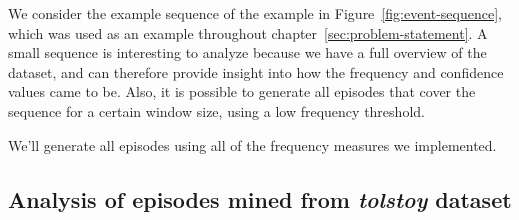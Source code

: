 We consider the example sequence of the example in Figure~\ref{fig:event-sequence}, which was used as an example throughout chapter~\ref{sec:problem-statement}. A small sequence is interesting to analyze because we have a full overview of the dataset, and can therefore provide insight into how the frequency and confidence values came to be. Also, it is possible to generate all episodes that cover the sequence for a certain window size, using a low frequency threshold.

We'll generate all episodes using all of the frequency measures we implemented.
\fi


\subsection{Analysis of episodes mined from \emph{tolstoy} dataset}
\label{sec:experiments-quality-episodes}

